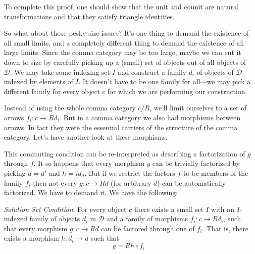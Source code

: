 \documentclass[11pt]{amsart}
\begin{document}
To complete this proof, one should show that the unit and counit are natural transformations and that they satisfy triangle identities. 

So what about those pesky size issues? It's one thing to demand the existence of all small limits, and a completely different thing to demand the existence of all large limits. Since the comma category may be too large, maybe we can cut it down to size by carefully picking up a (small) set of objects out of all objects of $\mathcal D$. We may take some indexing set $I$ and construct a family $d_i$ of objects of $\mathcal D$ indexed by elements of $I$. It doesn't have to be one family for all---we may pick a different family for every object $c$ for which we are performing our construction. 

Instead of using the whole comma category $c/R$, we'll limit ourselves to a set of arrows $f_i \colon c \to R d_i$. But in a comma category we also had morphisms between arrows. In fact they were the essential carriers of the structure of the comma category. Let's have another look at these morphisms.

\begin{figure}[H]
\centering
\end{figure}

This commuting condition can be re-interpreted as describing a factorization of $g$ through $f$. It so happens that every morphism $g$ can be trivially factorized by  picking $d = d'$ and $h = id_d$. But if we restrict the factors $f$ to be members of the family $f_i$ then not every $g \colon c \to R d$  (for arbitrary $d$) can be automatically factorized. We have to demand it. We have the following:

\emph{Solution Set Condition}: For every object $c$ there exists a small set $I$ with an $I$-indexed family of objects $d_i$ in $\mathcal D$ and a family of morphisms $f_i \colon c \to R d_i$, such that every morphism $g \colon c \to R d$ can be factored through one of $f_i$. That is, there exists a morphism $h \colon d_i \to d$ such that
\[g = R h \circ f_i \]
\end{document}
